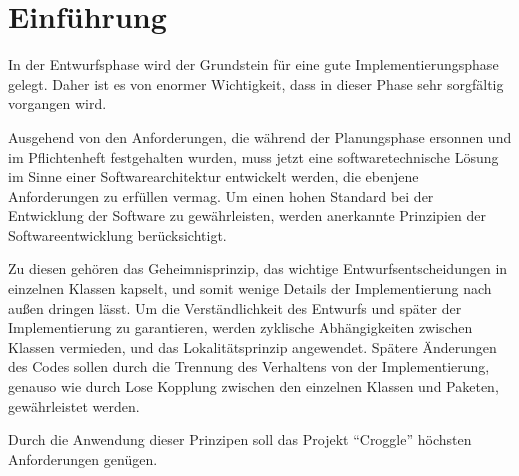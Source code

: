\chapter{Einführung}

In der Entwurfsphase wird der Grundstein für eine gute Implementierungsphase gelegt.
Daher ist es von enormer Wichtigkeit, dass in dieser Phase sehr sorgfältig vorgangen wird.

Ausgehend von den Anforderungen, die während der Planungsphase ersonnen und im Pflichtenheft festgehalten wurden, muss jetzt eine softwaretechnische Lösung im Sinne einer Softwarearchitektur entwickelt werden, die ebenjene Anforderungen zu erfüllen vermag.
Um einen hohen Standard bei der Entwicklung der Software zu gewährleisten, werden anerkannte Prinzipien der Softwareentwicklung berücksichtigt.

Zu diesen gehören das Geheimnisprinzip, das wichtige Entwurfsentscheidungen in einzelnen Klassen kapselt, und somit wenige Details der Implementierung nach außen dringen lässt.
Um die Verständlichkeit des Entwurfs und später der Implementierung zu garantieren, werden zyklische Abhängigkeiten zwischen Klassen vermieden, und das Lokalitätsprinzip angewendet.
Spätere Änderungen des Codes sollen durch die Trennung des Verhaltens von der Implementierung, genauso wie durch Lose Kopplung zwischen den einzelnen Klassen und Paketen, gewährleistet werden.

Durch die Anwendung dieser Prinzipen soll das Projekt "`Croggle"' höchsten Anforderungen genügen.
